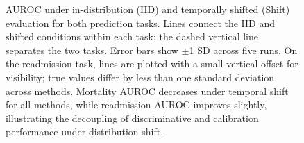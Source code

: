 \documentclass[11pt,a4paper]{article}
\begin{document}
\begin{figure}[htbp]
\caption{AUROC under in-distribution (IID) and temporally shifted (Shift) evaluation
for both prediction tasks. Lines connect the IID and shifted conditions within each
task; the dashed vertical line separates the two tasks. Error bars show $\pm$1 SD
across five runs. On the readmission task, lines are plotted with a small vertical
offset for visibility; true values differ by less than one standard deviation across
methods. Mortality AUROC decreases under temporal shift for all methods, while
readmission AUROC improves slightly, illustrating the decoupling of discriminative
and calibration performance under distribution shift.}
\label{fig:auroc_shift}
\end{figure}
\end{document}
